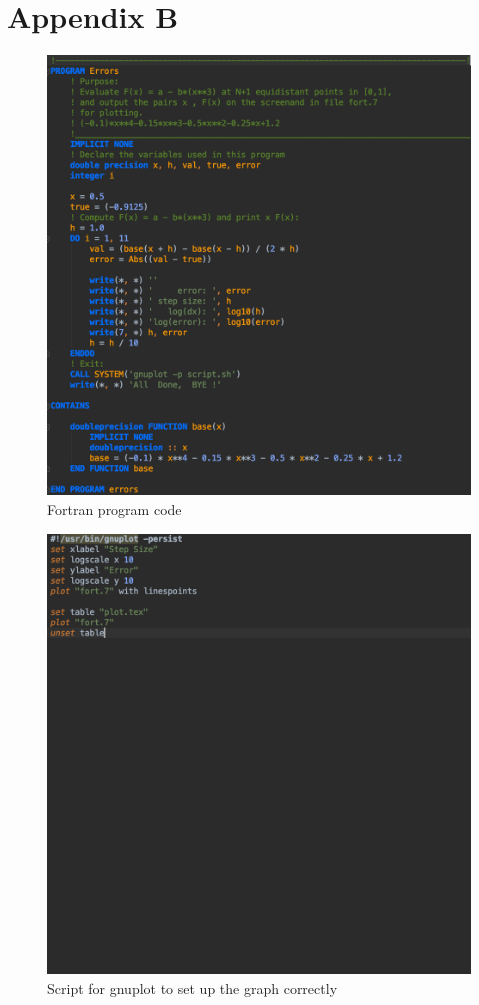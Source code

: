 \documentclass[12pt, letterpaper]{article}
\begin{document}
	\section{Appendix B}
		\begin{figure}[h]
			\centering
			\includegraphics[width=.988975\linewidth]{FortranCode.png}
			\caption{Fortran program code}
		\end{figure}
		
		\begin{figure}[h]
			\centering
			\includegraphics[width=\linewidth]{GnuplotCode.png}
			\caption{Script for gnuplot to set up the graph correctly}
		\end{figure}
\end{document}
